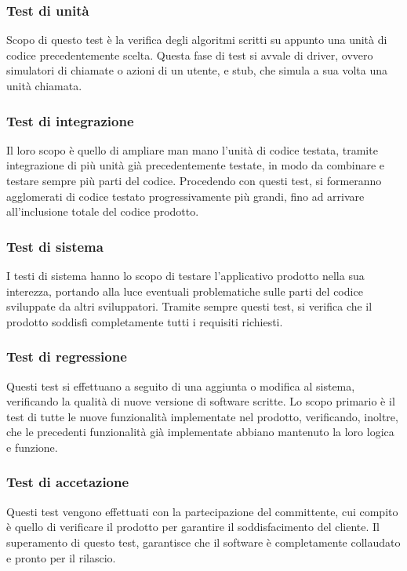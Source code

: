 \subsubsection{Test di unità}
Scopo di questo test è la verifica degli algoritmi scritti su appunto una unità di codice precedentemente scelta. Questa fase di test si avvale di driver, ovvero simulatori di chiamate o azioni di un utente, e stub, che simula a sua volta una unità chiamata.

\subsubsection{Test di integrazione}
Il loro scopo è quello di ampliare man mano l’unità di codice testata, tramite integrazione di più unità già precedentemente testate, in modo da combinare e testare sempre più parti del codice. Procedendo con questi test, si formeranno agglomerati di codice testato progressivamente più grandi, fino ad arrivare all’inclusione totale del codice prodotto.

\subsubsection{Test di sistema}
I testi di sistema hanno lo scopo di testare l’applicativo prodotto nella sua interezza, portando alla luce eventuali problematiche sulle parti del codice sviluppate da altri sviluppatori. Tramite sempre questi test, si verifica che il prodotto soddisfi completamente tutti i requisiti richiesti.

\subsubsection{Test di regressione}
Questi test si effettuano a seguito di una aggiunta o modifica al sistema, verificando la qualità di nuove versione di software scritte. Lo scopo primario è il test di tutte le nuove funzionalità implementate nel prodotto, verificando, inoltre, che le precedenti funzionalità già implementate abbiano mantenuto la loro logica e funzione.

\subsubsection{Test di accetazione}
Questi test vengono effettuati con la partecipazione del committente, cui compito è quello di verificare il prodotto per garantire il soddisfacimento del cliente. Il superamento di questo test, garantisce che il software è completamente collaudato e pronto per il rilascio.

